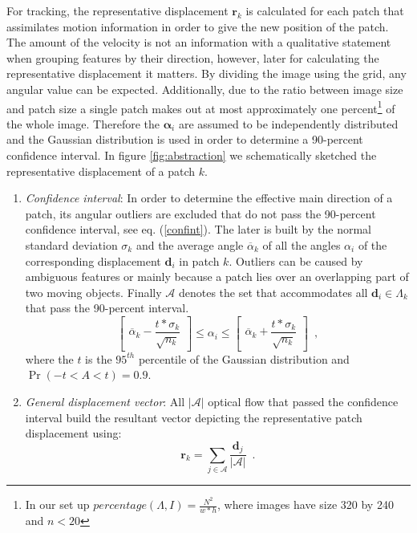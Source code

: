 For tracking, the representative displacement $\mathbf{r}_{k}$ is calculated for each patch that assimilates motion information in order to give the new position of the patch. The amount of the velocity is not an information with a qualitative statement when grouping features by their direction, however, later for calculating the representative displacement it matters. By dividing the image using the grid, any angular value can be expected. Additionally, due to the ratio between image size and patch size a single patch makes out at most approximately one percent\footnote{In our set up $ percentage \left( \Lambda, I \right) = \frac{N^2}{w*h}$, where images have size 320 by 240 and $n<20$ } of the whole image. Therefore the $\mathbf{\alpha}_i$ are assumed to be independently distributed and the Gaussian distribution is used in order to determine a 90-percent confidence interval. In figure \ref{fig:abstraction} we schematically sketched the representative displacement of a patch $k$.
%
\begin{enumerate}
		\item \textit{Confidence interval}: In order to determine the effective main direction of a patch, 
					its angular outliers are excluded that do not pass the 90-percent confidence interval, see eq. (\ref{confint}). 
					The later is built by the normal standard deviation $\sigma_k$ and the average angle $\overline{ \alpha }_k$ 
					of all the angles $\alpha_{i}$ of the corresponding displacement $\mathbf{d}_i$ in patch $k$. Outliers can be caused by ambiguous features or mainly 
					because a patch lies over an overlapping part of two moving objects. Finally $\mathcal{A}$ denotes the set 
					that accommodates all $\mathbf{d}_i \in \Lambda_k$ that pass the 90-percent interval.
					\begin{equation}
						\label{confint}
						\begin{bmatrix}  \overline{ \alpha}_{k} - \dfrac{t*\sigma_{k}}{\sqrt {n_{k}} } \end{bmatrix} 
						\leq \alpha_{i} \leq 
						\begin{bmatrix} \overline{ \alpha}_{k} + \dfrac{t*\sigma_{k}}{\sqrt {n_{k}} } \end{bmatrix} \enspace ,
					\end{equation}
					where the $t$ is the $95^{th}$ percentile of the Gaussian distribution and $\Pr\left(-t<A<t\right)=0.9$.

	\item \textit{General displacement vector}: All $|\mathcal{A}|$ optical flow that passed the confidence interval 
				build the resultant vector depicting the representative patch displacement using:
				\begin{equation}
				\label{representative}
				\mathbf{r}_k  =  \sum_{j \in \mathcal{A}}{\frac{\mathbf{d}_j}{|\mathcal{A}|} } \enspace .
				\end{equation}
				\end{enumerate}
